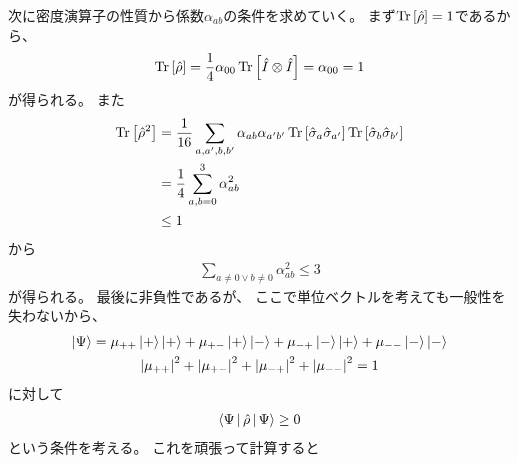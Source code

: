 \documentclass[a4paper, 10pt]{jsarticle}
\begin{document}
次に密度演算子の性質から係数$\alpha_{ab}$の条件を求めていく。
まず$\operatorname*{Tr} \left[ \hat{\rho} \right] = 1$であるから、
\begin{align}
	\operatorname*{Tr} \left[ \hat{\rho} \right]
	= \frac{1}{4} \alpha_{00} \operatorname*{Tr} \left[ \hat{I} \otimes \hat{I} \right]
	= \alpha_{00}
	= 1
\end{align}
が得られる。
また
\begin{align}
	\operatorname*{Tr} \left[ \hat{\rho}^2 \right]
	&= \frac{1}{16} \sum_{a,a',b,b'} \alpha_{ab} \alpha_{a'b'}
	\operatorname*{Tr} \left[ \hat{\sigma}_a \hat{\sigma}_{a'} \right]
	\operatorname*{Tr} \left[ \hat{\sigma}_b \hat{\sigma}_{b'} \right] \\
	&= \frac{1}{4} \sum_{a,b = 0}^3 \alpha_{ab}^2 \\
	&\leq 1
\end{align}
から
\begin{align}
	\sum_{a \neq 0 \lor b \neq 0} \alpha^2_{ab} \leq 3
\end{align}
が得られる。
最後に非負性であるが、
ここで単位ベクトルを考えても一般性を失わないから、
\begin{gather}
	\Ket{\Psi} = \mu_{++} \Ket{+} \Ket{+} + \mu_{+-} \Ket{+} \Ket{-}
	+ \mu_{-+} \Ket{-} \Ket{+} + \mu_{--} \Ket{-} \Ket{-} \\
	\left| \mu_{++} \right|^2 + \left| \mu_{+-} \right|^2
	+ \left| \mu_{-+} \right|^2 + \left| \mu_{--} \right|^2 = 1
\end{gather}
に対して
\begin{align}
	\Braket{\Psi | \hat{\rho} | \Psi} \geq 0
\end{align}
という条件を考える。
これを頑張って計算すると
\end{document}
